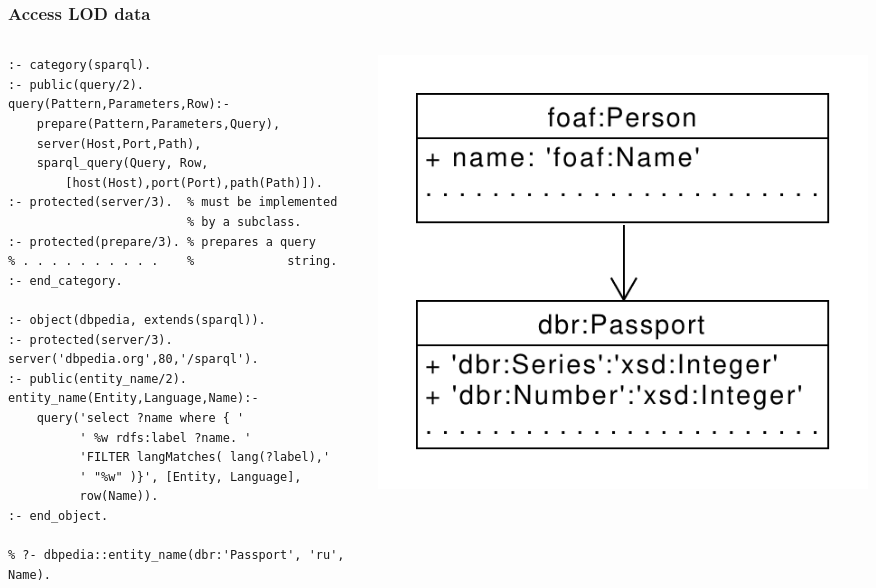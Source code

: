 \documentclass[10pt]{beamer}
\begin{document}
\begin{frame}[fragile]
  \frametitle{Access LOD data}

  \begin{columns}
\begin{column}{0.5\textwidth}
\begin{verbatim}
:- category(sparql).
:- public(query/2).
query(Pattern,Parameters,Row):-
    prepare(Pattern,Parameters,Query),
    server(Host,Port,Path),
    sparql_query(Query, Row,
        [host(Host),port(Port),path(Path)]).
:- protected(server/3).  % must be implemented
                         % by a subclass.
:- protected(prepare/3). % prepares a query
% . . . . . . . . . .    %             string.
:- end_category.

:- object(dbpedia, extends(sparql)).
:- protected(server/3).
server('dbpedia.org',80,'/sparql').
:- public(entity_name/2).
entity_name(Entity,Language,Name):-
    query('select ?name where { '
          ' %w rdfs:label ?name. '
          'FILTER langMatches( lang(?label),'
          ' "%w" )}', [Entity, Language],
          row(Name)).
:- end_object.

% ?- dbpedia::entity_name(dbr:'Passport', 'ru', Name).
\end{verbatim}
\end{column}
\begin{column}{0.5\textwidth}
  \flushright
\includegraphics[width=0.8\linewidth]{simple-diag.pdf}
\end{column}
\end{columns}
\end{frame}
\end{document}
